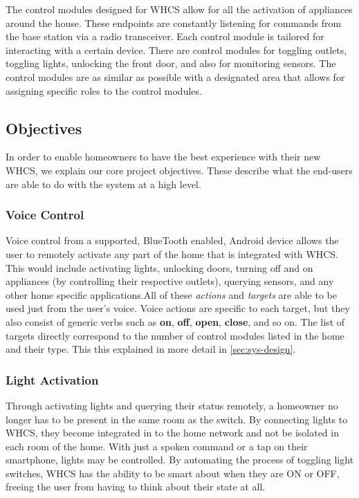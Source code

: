 The control modules designed for WHCS allow for all the activation of
appliances around the house. These endpoints are constantly listening for commands from the base station via a radio transceiver. Each control module is tailored for interacting with a certain device. There are control modules
for toggling outlets, toggling lights, unlocking the front door, and also for
monitoring sensors. The control modules are as similar as possible with a
designated area that allows for assigning specific roles to the control
modules.


\subsection{Objectives}
In order to enable homeowners to have the best experience with their new WHCS,
we explain our core project objectives. These describe what the end-users
are able to do with the system at a high level.

\subsubsection{Voice Control}
Voice control from a supported, BlueTooth enabled, Android device allows
the user to remotely activate any part of the home that is integrated with
WHCS. This would include activating lights, unlocking doors, turning off and on
appliances (by controlling their respective outlets), querying sensors, and any
other home specific applications.\footnotemark All of these \emph{actions} and
\emph{targets} are able to be used just from the user's voice. Voice
actions are specific to each target, but they also consist of generic verbs such as
\textbf{on}, \textbf{off}, \textbf{open}, \textbf{close},
and so on. The list of targets directly correspond to the number of
control modules listed in the home and their type. This this explained in
more detail in \autoref{sec:sys-design}.


\subsubsection{Light Activation}
Through activating lights and querying their status remotely, a homeowner
no longer has to be present in the same room as the switch.  By connecting
lights to WHCS, they become integrated in to the home network and not be
isolated in each room of the home.  With just a spoken command or a tap on
their smartphone, lights may be controlled.  By automating the process of
toggling light switches, WHCS has the ability to be smart about when they
are ON or OFF, freeing the user from having to think about their state at all.

